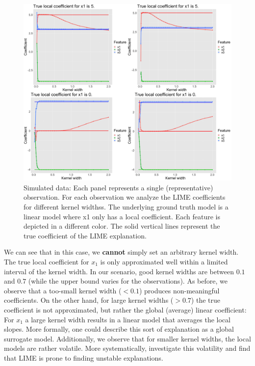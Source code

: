 \documentclass[]{krantz}
\begin{document}
\begin{figure}

{\centering \includegraphics[width=0.99\linewidth]{images/04-09-10} 

}

\caption{Simulated data: Each panel represents a single (representative) observation. For each observation we analyze the LIME coefficients for different kernel widthss. The underlying ground truth model is a linear model where x1 only has a local coefficient. Each feature is depicted in a different color. The solid vertical lines represent the true coefficient of the LIME explanation.}\label{fig:lime-fig10}
\end{figure}

We can see that in this case, we \textbf{cannot} simply set an arbitrary
kernel width. The true local coefficient for \(x_1\) is only
approximated well within a limited interval of the kernel width. In our
scenario, good kernel widths are between \(0.1\) and \(0.7\) (while the
upper bound varies for the observations). As before, we observe that a
too-small kernel width (\(< 0.1\)) produces non-meaningful coefficients.
On the other hand, for large kernel widths (\(> 0.7\)) the true
coefficient is not approximated, but rather the global (average) linear
coefficient: For \(x_1\) a large kernel width results in a linear model
that averages the local slopes. More formally, one could describe this
sort of explanation as a global surrogate model. Additionally, we
observe that for smaller kernel widths, the local models are rather
volatile. More systematically, \citet{alvarez2018robustness} investigate
this volatility and find that LIME is prone to finding unstable
explanations.
\end{document}
